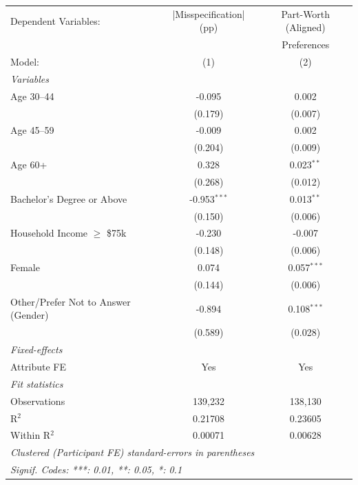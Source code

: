   \begin{tabular}{lcc}
      \tabularnewline \midrule \midrule
      Dependent Variables:                & |Misspecification| (pp) & Part-Worth (Aligned)\\  
                                          &                         & Preferences \\   
      Model:                              & (1)                     & (2)\\  
      \midrule
      \emph{Variables}\\
      Age 30--44                          & -0.095                  & 0.002\\   
                                          & (0.179)                 & (0.007)\\   
      Age 45--59                          & -0.009                  & 0.002\\   
                                          & (0.204)                 & (0.009)\\   
      Age 60+                             & 0.328                   & 0.023$^{**}$\\   
                                          & (0.268)                 & (0.012)\\   
      Bachelor's Degree or Above          & -0.953$^{***}$          & 0.013$^{**}$\\   
                                          & (0.150)                 & (0.006)\\   
      Household Income $\geq$ \$75k       & -0.230                  & -0.007\\   
                                          & (0.148)                 & (0.006)\\   
      Female                              & 0.074                   & 0.057$^{***}$\\   
                                          & (0.144)                 & (0.006)\\   
      Other/Prefer Not to Answer (Gender) & -0.894                  & 0.108$^{***}$\\   
                                          & (0.589)                 & (0.028)\\   
      \midrule
      \emph{Fixed-effects}\\
      Attribute FE                        & Yes                     & Yes\\  
      \midrule
      \emph{Fit statistics}\\
      Observations                        & 139,232                 & 138,130\\  
      R$^2$                               & 0.21708                 & 0.23605\\  
      Within R$^2$                        & 0.00071                 & 0.00628\\  
      \midrule \midrule
      \multicolumn{3}{l}{\emph{Clustered (Participant FE) standard-errors in parentheses}}\\
      \multicolumn{3}{l}{\emph{Signif. Codes: ***: 0.01, **: 0.05, *: 0.1}}\\
   \end{tabular}
